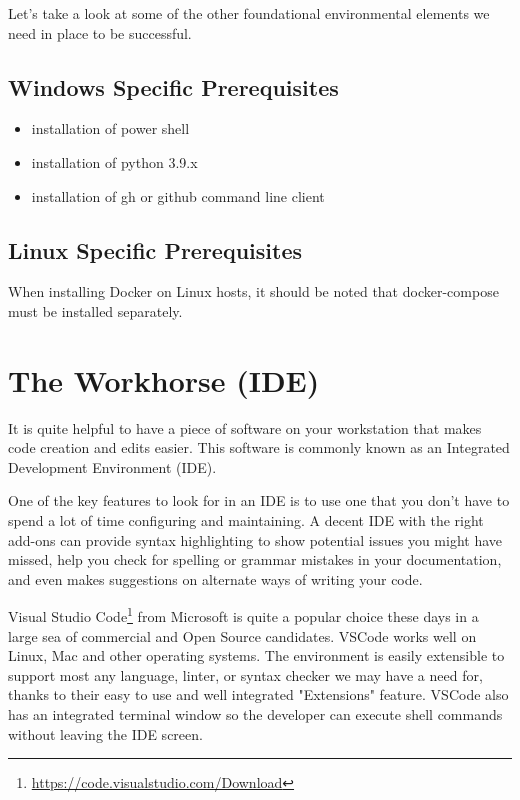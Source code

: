 \justify
Let's take a look at some of the other foundational environmental
elements we need in place to be successful.

\subsection{Windows Specific Prerequisites}

\begin{itemize}
\item installation of power shell
\item installation of python 3.9.x
\item installation of gh or github command line client
\end{itemize}

\subsection{Linux Specific Prerequisites}
\justify
When installing Docker on Linux hosts, it should be noted that docker-compose must be installed separately.

\section{The Workhorse (IDE)}
\justify
It is quite helpful to have a piece of software on your workstation that
makes code creation and edits easier. This software is commonly known as
an Integrated Development Environment (IDE).

\justify
One of the key features to look for in an IDE is to use one that you
don't have to spend a lot of time configuring and maintaining. A decent
IDE with the right add-ons can provide syntax highlighting to show
potential issues you might have missed, help you check for spelling or
grammar mistakes in your documentation, and even makes suggestions on
alternate ways of writing your code.

\justify
Visual Studio Code\footnote{\url{https://code.visualstudio.com/Download}}
from Microsoft is quite a popular choice these days in a large sea of
commercial and Open Source candidates. VSCode works well on Linux, Mac
and other operating systems. The environment is easily extensible to
support most any language, linter, or syntax checker we may have a need
for, thanks to their easy to use and well integrated "Extensions"
feature. VSCode also has an integrated terminal window so the developer
can execute shell commands without leaving the IDE screen.
 
